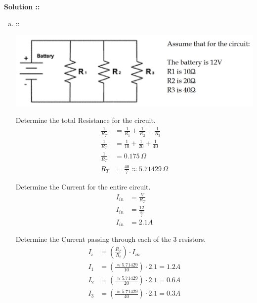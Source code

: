 \documentclass[11pt]{article}
\begin{document}
\vspace{5px}\textbf{Solution ::}
\begin{enumerate}[a)]
\item ::
\begin{center}
    \includegraphics[scale=0.2]{3a.png}
\end{center}
Determine the total Resistance for the circuit.
\begin{align*}
    \frac{1}{R_T} &= \frac{1}{R_1} + \frac{1}{R_2} + \frac{1}{R_3} \\
    \frac{1}{R_T} &= \frac{1}{10} + \frac{1}{20} + \frac{1}{40} \\
    \frac{1}{R_T} &= 0.175\,\Omega \\
    R_T &= \frac{40}{7} \approx 5.71429\,\Omega
\end{align*}

Determine the Current for the entire circuit.
\begin{align*}
    I_{in} &= \frac{V}{R_T} \\
    I_{in} &= \frac{12}{\frac{40}{7}} \\
    I_{in} &= 2.1A
\end{align*}

Determine the Current passing through each of the 3 resistors.
\begin{align*}
    I_i &= \left(\frac{R_T}{R_i}\right)\cdot I_{in} \\
    I_1 &= \left(\frac{\approx5.71429}{10}\right)\cdot 2.1 = 1.2A \\
    I_2 &= \left(\frac{\approx5.71429}{20}\right)\cdot 2.1 = 0.6A \\
    I_3 &= \left(\frac{\approx5.71429}{40}\right)\cdot 2.1 = 0.3A
\end{align*}


\end{enumerate}
\end{document}
